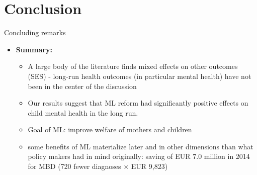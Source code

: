 \documentclass[aspectratio=169,handout]{beamer} %
\begin{document}
\section{Conclusion}
\begin{frame}{Concluding remarks}
\begin{itemize}
\item \textbf{Summary:}\label{CONCLUSION}
\begin{itemize}
\item A large body of the literature finds mixed effects on other outcomes (SES) - long-run health outcomes (in particular mental health) have not been in the center of the discussion

\item Our results suggest that ML reform had significantly positive effects on child mental health in the long run.

\item Goal of ML: improve welfare of mothers and children

\item some benefits of ML materialize later and in other dimensions than what policy makers had in mind originally:  saving of EUR 7.0 million in 2014 for MBD \newline  (720 fewer diagnoses $\times$ EUR 9,823)




\end{itemize}
\end{itemize}

\hyperlink{MZ}{}


\end{frame}
\end{document}
